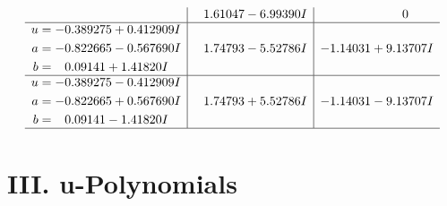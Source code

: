 \documentclass[1p]{elsarticle_modified}
\theoremstyle{definition}
\begin{document}
$$\begin{array}{c|c|c}
 & \phantom{-}1.61047 - 6.99390 I & \phantom{-0.000000 } 0 \\ \hline\begin{aligned}
u &= -0.389275 + 0.412909 I \\
a &= -0.822665 - 0.567690 I \\
b &= \phantom{-}0.09141 + 1.41820 I\end{aligned}
 & \phantom{-}1.74793 - 5.52786 I & -1.14031 + 9.13707 I \\ \hline\begin{aligned}
u &= -0.389275 - 0.412909 I \\
a &= -0.822665 + 0.567690 I \\
b &= \phantom{-}0.09141 - 1.41820 I\end{aligned}
 & \phantom{-}1.74793 + 5.52786 I & -1.14031 - 9.13707 I\\
 \hline 
 \end{array}$$\newpage
\newpage\renewcommand{\arraystretch}{1}
\centering \section*{ III. u-Polynomials}
\end{document}
